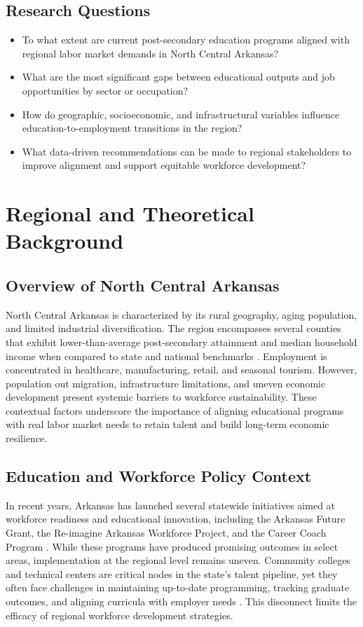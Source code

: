 \documentclass[runningheads]{llncs}
\begin{document}
\subsection{Research Questions}
\begin{itemize}
    \item To what extent are current post-secondary education programs aligned with regional labor market demands in North Central Arkansas?
    \item What are the most significant gaps between educational outputs and job opportunities by sector or occupation?
    \item How do geographic, socioeconomic, and infrastructural variables influence education-to-employment transitions in the region?
    \item What data-driven recommendations can be made to regional stakeholders to improve alignment and support equitable workforce development?
\end{itemize}

\section{Regional and Theoretical Background}

\subsection{Overview of North Central Arkansas}
North Central Arkansas is characterized by its rural geography, aging population, and limited industrial diversification. The region encompasses several counties that exhibit lower-than-average post-secondary attainment and median household income when compared to state and national benchmarks \cite{ncarlocal2020,discover2022}. Employment is concentrated in healthcare, manufacturing, retail, and seasonal tourism. However, population out migration, infrastructure limitations, and uneven economic development present systemic barriers to workforce sustainability. These contextual factors underscore the importance of aligning educational programs with real labor market needs to retain talent and build long-term economic resilience.

\subsection{Education and Workforce Policy Context}
In recent years, Arkansas has launched several statewide initiatives aimed at workforce readiness and educational innovation, including the Arkansas Future Grant, the Re-imagine Arkansas Workforce Project, and the Career Coach Program \cite{ncarlocal2020,careertech2020}. While these programs have produced promising outcomes in select areas, implementation at the regional level remains uneven. Community colleges and technical centers are critical nodes in the state’s talent pipeline, yet they often face challenges in maintaining up-to-date programming, tracking graduate outcomes, and aligning curricula with employer needs \cite{careertech2020,jff2024}. This disconnect limits the efficacy of regional workforce development strategies.
\end{document}
